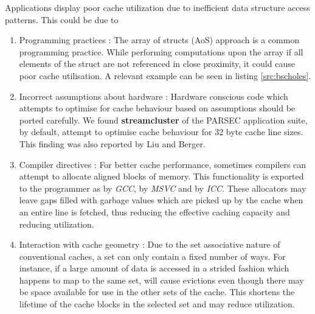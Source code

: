 Applications display poor cache utilization due to inefficient data structure access patterns. This could be due to 
\begin{enumerate}
  \item Programming practices : The array of structs (AoS) approach is a common programming practice. While performing computations upon the array if all elements of the struct are not referenced in close proximity, it could cause poor cache utilisation. A relevant example can be seen in listing \ref{src:bscholes}.
  \item Incorrect assumptions about hardware : Hardware conscious code which attempts to optimise for cache behaviour based on assumptions should be ported carefully. We found \textbf{streamcluster} of the PARSEC application suite, by default, attempt to optimise cache behaviour for 32 byte cache line sizes. This finding was also reported by Liu and Berger\cite{Liu:2011:SPD:2048066.2048070}.
  \item Compiler directives : For better cache performance, sometimes compilers can attempt to allocate aligned blocks of memory. This functionality is exported to the programmer as  by \textit{GCC},  by \textit{MSVC} and  by \textit{ICC}. These allocators may leave gaps filled with garbage values which are picked up by the cache when an entire line is fetched, thus reducing the effective caching capacity and reducing utilization.
  \item Interaction with cache geometry : Due to the set associative nature of conventional caches, a set can only contain a fixed number of ways. For instance, if a large amount of data is accessed in a strided fashion which happens to map to the same set, will cause evictions even though there may be space available for use in the other sets of the cache. This shortens the lifetime of the cache blocks in the selected set and may reduce utilization.
\end{enumerate}


